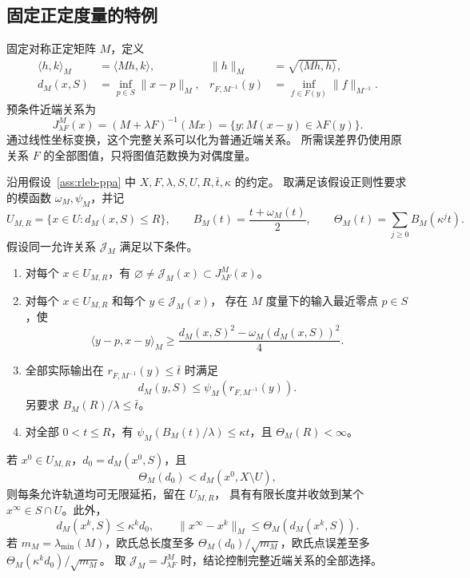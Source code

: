 \subsection{固定正定度量的特例}
\label{sec:gppa-transfer}

固定对称正定矩阵 $M$，定义
\[
 \begin{aligned}
 \langle h,k\rangle_M&=\langle Mh,k\rangle,
 &\|h\|_M&=\sqrt{\langle Mh,h\rangle},\\
 d_M(x,S)&=\inf_{p\in S}\|x-p\|_M,
 &r_{F,M^{-1}}(y)&=\inf_{f\in F(y)}\|f\|_{M^{-1}}.
 \end{aligned}
\]
预条件近端关系为
\[
 J^M_{\lambda F}(x)=(M+\lambda F)^{-1}(Mx)
 =\{y:M(x-y)\in\lambda F(y)\}.
\]
通过线性坐标变换，这个完整关系可以化为普通近端关系。
所需误差界仍使用原关系 $F$ 的全部图值，只将图值范数换为对偶度量。

\begin{corollary}[固定正定核的局部收敛]
\label{cor:gppa-spd}
沿用假设~\ref{ass:rleb-ppa} 中
$X,F,\lambda,S,U,R,\bar t,\kappa$ 的约定。
取满足该假设正则性要求的模函数 $\omega_M,\psi_M$，并记
\[
 U_{M,R}=\{x\in U:d_M(x,S)\le R\},\qquad
 B_M(t)=\frac{t+\omega_M(t)}2,\qquad
 \Theta_M(t)=\sum_{j\ge0}B_M(\kappa^jt).
\]
假设同一允许关系 $\mathcal J_M$ 满足以下条件。
\begin{enumerate}
\item 对每个 $x\in U_{M,R}$，有
$\varnothing\ne\mathcal J_M(x)\subset J^M_{\lambda F}(x)$。
\item 对每个 $x\in U_{M,R}$ 和每个 $y\in\mathcal J_M(x)$，
存在 $M$ 度量下的输入最近零点 $p\in S$，使
\[
 \langle y-p,x-y\rangle_M
 \ge\frac{d_M(x,S)^2-\omega_M(d_M(x,S))^2}{4}.
\]
\item 全部实际输出在 $r_{F,M^{-1}}(y)\le\bar t$ 时满足
\[
 d_M(y,S)\le\psi_M(r_{F,M^{-1}}(y)).
\]
另要求 $B_M(R)/\lambda\le\bar t$。
\item 对全部 $0<t\le R$，有
$\psi_M(B_M(t)/\lambda)\le\kappa t$，且 $\Theta_M(R)<\infty$。
\end{enumerate}
若 $x^0\in U_{M,R}$，$d_0=d_M(x^0,S)$，且
\[
 \Theta_M(d_0)<d_M(x^0,X\setminus U),
\]
则每条允许轨道均可无限延拓，留在 $U_{M,R}$，
具有有限长度并收敛到某个 $x^\infty\in S\cap U$。此外，
\[
 d_M(x^k,S)\le\kappa^kd_0,\qquad
 \|x^\infty-x^k\|_M\le\Theta_M(d_M(x^k,S)).
\]
若 $m_M=\lambda_{\min}(M)$，欧氏总长度至多
$\Theta_M(d_0)/\sqrt{m_M}$，欧氏点误差至多
$\Theta_M(\kappa^kd_0)/\sqrt{m_M}$。
取 $\mathcal J_M=J^M_{\lambda F}$ 时，结论控制完整近端关系的全部选择。
\end{corollary}

